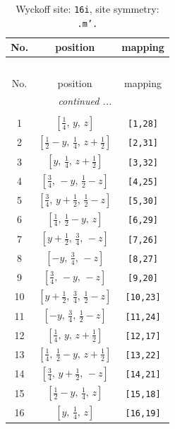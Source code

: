 \documentclass[fleqn,8pt]{jsarticle}
\begin{document}
\renewcommand{\arraystretch}{1.2}
\begin{longtable}{ccc}
\caption{Wyckoff site: {\tt 16i}, site symmetry: {\tt .m'.}}
 \\
 \hline \hline
No. & position & mapping \\ \hline \endfirsthead

\multicolumn{2}{l}{\tablename\ \thetable{}} \\
 \hline \hline
No. & position & mapping \\ \hline \endhead

 \hline \hline
\multicolumn{2}{r}{\footnotesize\it continued ...} \\ \endfoot

 \hline \hline
\multicolumn{2}{r}{} \\ \endlastfoot

1 & $\left[ \frac{1}{4},\, y,\, z \right]$ & {\tt [1,28]} \\ \hline
2 & $\left[ \frac{1}{2} - y,\, \frac{1}{4},\, z + \frac{1}{2} \right]$ & {\tt [2,31]} \\ \hline
3 & $\left[ y,\, \frac{1}{4},\, z + \frac{1}{2} \right]$ & {\tt [3,32]} \\ \hline
4 & $\left[ \frac{3}{4},\, - y,\, \frac{1}{2} - z \right]$ & {\tt [4,25]} \\ \hline
5 & $\left[ \frac{3}{4},\, y + \frac{1}{2},\, \frac{1}{2} - z \right]$ & {\tt [5,30]} \\ \hline
6 & $\left[ \frac{1}{4},\, \frac{1}{2} - y,\, z \right]$ & {\tt [6,29]} \\ \hline
7 & $\left[ y + \frac{1}{2},\, \frac{3}{4},\, - z \right]$ & {\tt [7,26]} \\ \hline
8 & $\left[ - y,\, \frac{3}{4},\, - z \right]$ & {\tt [8,27]} \\ \hline
9 & $\left[ \frac{3}{4},\, - y,\, - z \right]$ & {\tt [9,20]} \\ \hline
10 & $\left[ y + \frac{1}{2},\, \frac{3}{4},\, \frac{1}{2} - z \right]$ & {\tt [10,23]} \\ \hline
11 & $\left[ - y,\, \frac{3}{4},\, \frac{1}{2} - z \right]$ & {\tt [11,24]} \\ \hline
12 & $\left[ \frac{1}{4},\, y,\, z + \frac{1}{2} \right]$ & {\tt [12,17]} \\ \hline
13 & $\left[ \frac{1}{4},\, \frac{1}{2} - y,\, z + \frac{1}{2} \right]$ & {\tt [13,22]} \\ \hline
14 & $\left[ \frac{3}{4},\, y + \frac{1}{2},\, - z \right]$ & {\tt [14,21]} \\ \hline
15 & $\left[ \frac{1}{2} - y,\, \frac{1}{4},\, z \right]$ & {\tt [15,18]} \\ \hline
16 & $\left[ y,\, \frac{1}{4},\, z \right]$ & {\tt [16,19]} \\
\end{longtable}
\end{document}
